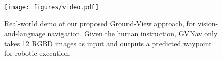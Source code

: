 
\begin{figure}[t]
      \centering
      \texttt{[image: figures/video.pdf]}
      \vspace{-10pt}
      \caption{Real-world demo of our proposed Ground-View approach, for vision-and-language navigation. Given the human instruction, GVNav only takes 12 RGBD images as input and outputs a predicted waypoint for robotic execution.}
      \label{demo}
      \vspace{-15pt}
\end{figure}



